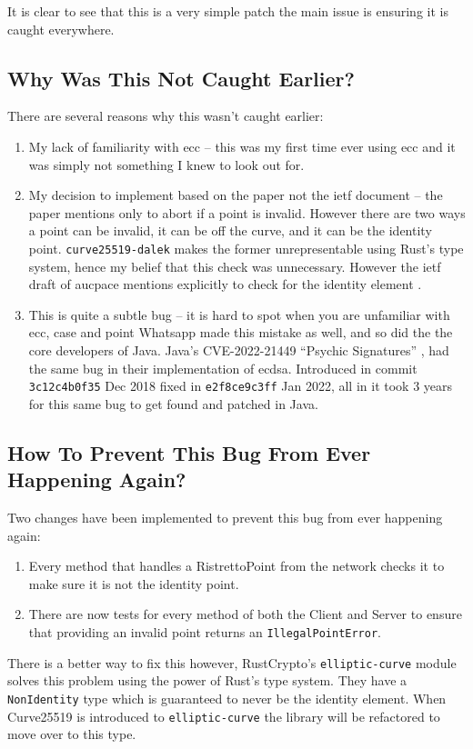 It is clear to see that this is a very simple patch the main issue is ensuring it is caught everywhere.

\subsection{Why Was This Not Caught Earlier?}
There are several reasons why this wasn't caught earlier:
\begin{enumerate}
  \item{My lack of familiarity with \gls{ecc} -- this was my first time ever using \gls{ecc} and it was simply not something I knew to look out for.}
  \item{My decision to implement based on the paper not the \gls{ietf} document -- the paper mentions only to abort if a point is invalid. However there are two ways a point can be invalid, it can be off the curve, and it can be the identity point. \texttt{curve25519-dalek} makes the former unrepresentable using Rust's type system, hence my belief that this check was unnecessary. However the \gls{ietf} draft of \gls{aucpace} mentions explicitly to check for the identity element \cite{ietf-aucpace}.}
  \item{This is quite a subtle bug -- it is hard to spot when you are unfamiliar with \gls{ecc}, case and point Whatsapp made this mistake as well, and so did the the core developers of Java. Java's CVE-2022-21449 \enquote{Psychic Signatures} \cite{java-psychic-signatures}, had the same bug in their implementation of \gls{ecdsa}. Introduced in commit \texttt{3c12c4b0f35} Dec 2018 fixed in \texttt{e2f8ce9c3ff} Jan 2022, all in it took 3 years for this same bug to get found and patched in Java.}
\end{enumerate}

\subsection{How To Prevent This Bug From Ever Happening Again?}
Two changes have been implemented to prevent this bug from ever happening again:
\begin{enumerate}
  \item{Every method that handles a RistrettoPoint from the network checks it to make sure it is not the identity point.}
  \item{There are now tests for every method of both the Client and Server to ensure that providing an invalid point returns an \texttt{IllegalPointError}.}
\end{enumerate}

There is a better way to fix this however, RustCrypto's \texttt{elliptic-curve} module solves this problem using the power of Rust's type system.
They have a \texttt{NonIdentity} type which is guaranteed to never be the identity element.
When Curve25519 is introduced to \texttt{elliptic-curve} the library will be refactored to move over to this type.

